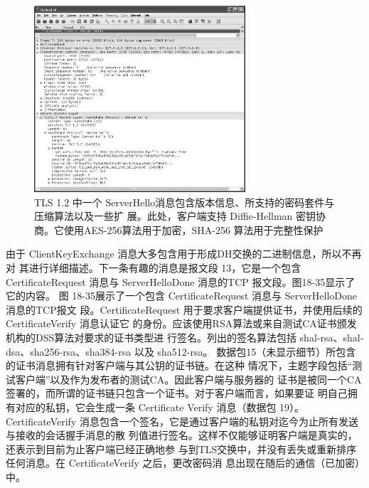 \begin{figure}[!htb]
    \centering
	\includegraphics[width=0.7\textwidth]{imgs/18/18-33.png}
	\caption{TLS 1.2 中一个 ServerHello消息包含版本信息、所支持的密码套件与压缩算法以及一些扩
            展。此处，客户端支持 Diffie-Hellman 密钥协商。它使用AES-256算法用于加密，SHA-256
            算法用于完整性保护}
\end{figure}

由于 ClientKeyExchange 消息大多包含用于形成DH交换的二进制信息，所以不再对
其进行详细描述。下一条有趣的消息是报文段 13，它是一个包含 CertificateRequest 消息与
ServerHelloDone 消息的TCP 报文段。图18-35显示了它的内容。
图 18-35展示了一个包含 CertificateRequest 消息与 ServerHelloDone 消息的TCP报文
段。CertificateRequest 用于要求客户端提供证书，并使用后续的 CertificateVerify 消息认证它
的身份。应该使用RSA算法或来自测试CA证书颁发机构的DSS算法对要求的证书类型进
行签名。列出的签名算法包括 shal-rsa、shal-dsa、sha256-rsa、sha384-rsa 以及 sha512-rsa。
数据包15（未显示细节）所包含的证书消息拥有针对客户端与其公钥的证书链。在这种
情况下，主题字段包括“测试客户端”以及作为发布者的测试CA。因此客户端与服务器的
证书是被同一个CA签署的，而所谓的证书链只包含一个证书。对于客户端而言，如果要证
明自己拥有对应的私钥，它会生成一条 Certificate Verify 消息（数据包 19）。CertificateVerify
消息包含一个签名，它是通过客户端的私钥对迄今为止所有发送与接收的会话握手消息的散
列值进行签名。这样不仅能够证明客户端是真实的，还表示到目前为止客户端已经正确地参
与到TLS交换中，并没有丢失或重新排序任何消息。在 CertificateVerify 之后，更改密码消
息出现在随后的通信（已加密）中。

